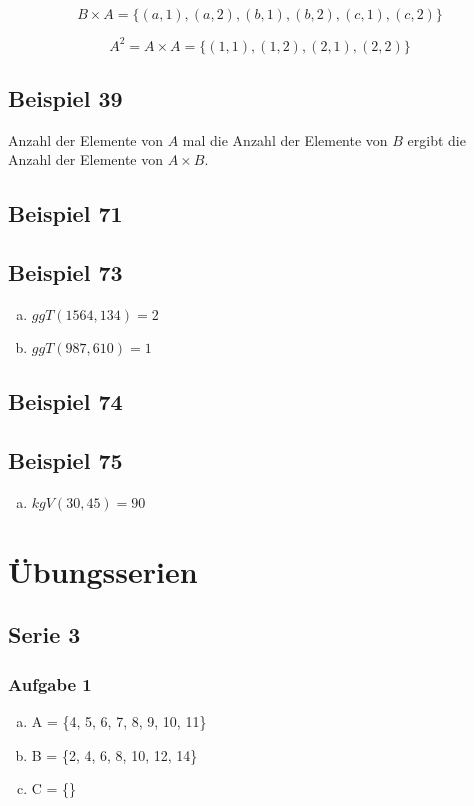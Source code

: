 \documentclass[12pt, a4paper, oneside]{article}
\begin{document}
\begin{equation*}
  B \times A = \{(a, 1), (a, 2), (b, 1), (b, 2), (c, 1), (c, 2)\}
\end{equation*}

\begin{equation*}
  A^{2} = A \times A = \{(1, 1), (1, 2), (2, 1), (2, 2)\}
\end{equation*}

\subsection{Beispiel 39}
Anzahl der Elemente von $A$ mal die Anzahl der Elemente von $B$ ergibt die Anzahl der Elemente von $A \times B$.

\subsection{Beispiel 71}


\subsection{Beispiel 73}
\begin{enumerate}[(a)]
  \item $ggT(1564, 134) = 2$
  \item $ggT(987, 610) = 1$
\end{enumerate}

\subsection{Beispiel 74}

\subsection{Beispiel 75} 
\begin{enumerate}[(a)]
  \item $kgV(30, 45) = 90$
\end{enumerate}

\newpage
\section{Übungsserien}
\subsection{Serie 3}
\subsubsection{Aufgabe 1}
\begin{enumerate}[(a)]
  \item A = \{4, 5, 6, 7, 8, 9, 10, 11\}
  \item B = \{2, 4, 6, 8, 10, 12, 14\}
  \item C = \{\}
\end{enumerate}
\end{document}
